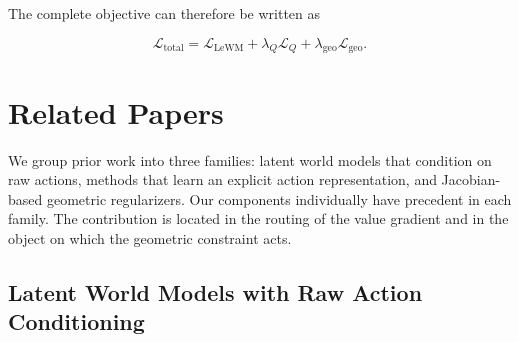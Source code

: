 ﻿\documentclass{article}
\begin{document}
The complete objective can therefore be written as

\[
\mathcal{L}_{\mathrm{total}}
=
\mathcal{L}_{\mathrm{LeWM}}
+
\lambda_Q \mathcal{L}_Q
+
\lambda_{\mathrm{geo}}
\mathcal{L}_{\mathrm{geo}}.
\]

\section{Related Papers}

We group prior work into three families: latent world models that condition
on raw actions, methods that learn an explicit action representation, and
Jacobian-based geometric regularizers. Our components individually have
precedent in each family. The contribution is located in the routing of the
value gradient and in the object on which the geometric constraint acts.

\subsection{Latent World Models with Raw Action Conditioning}
\end{document}
